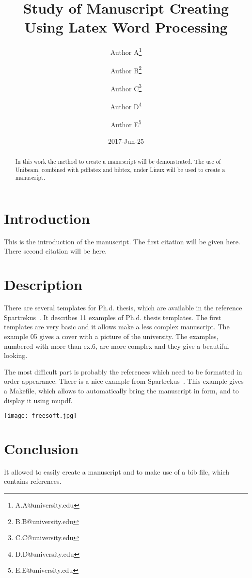 \documentclass[11pt]{article}
\date{2017-Jun-25}
\title{Study of Manuscript Creating Using Latex Word Processing }
\author[1]{Author A\thanks{A.A@university.edu}}
\author[1]{Author B\thanks{B.B@university.edu}}
\author[1]{Author C\thanks{C.C@university.edu}}
\author[2]{Author D\thanks{D.D@university.edu}}
\author[2]{Author E\thanks{E.E@university.edu}}
\affil[1]{Department of Computer Science, \LaTeX\ University}
\affil[2]{Department of Mechanical Engineering, \LaTeX\ University}
\begin{document}
\maketitle

\begin{abstract}
In this work the method to create a manuscript will be demonstrated.
 The use of Unibeam, combined with pdflatex and bibtex, under Linux will be used to create a manuscript. 
\end{abstract}


\section{Introduction}
This is the introduction of the manuscript.
The first citation will be given here.\cite{spartrekus2324898}
There second citation will be here.\cite{spartrekus2324897}

\section{Description}
There are several templates for Ph.d. thesis, which are available in the 
reference Spartrekus~\cite{spartrekus2324898}.
It describes 11 examples of Ph.d. thesis templates. The first templates 
are very basic and it allows make a less complex manuscript.
The example 05 gives a cover with a picture of the university.
The examples, numbered with more than ex.6, are more complex and 
they give a beautiful looking.

The most difficult part is probably the references which need to be 
formatted in order appearance. 
There is a nice example from Spartrekus~\cite{spartrekus2324897}.
This example gives a Makefile, which allows to automatically bring
the manuscript in form, and to display it using mupdf. 

\begin{center}
\texttt{[image: freesoft.jpg]}
\end{center}

\section{Conclusion}
It allowed to easily create a manuscript and to make use of a bib file, which contains references.

{}

\end{document}
